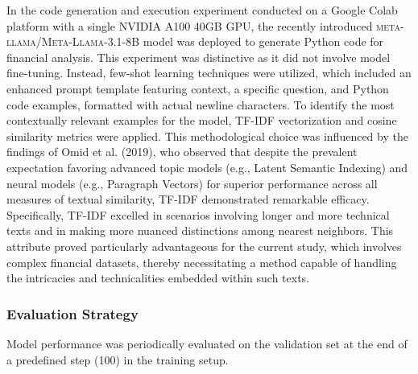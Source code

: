 \documentclass[logo,msc]{infthesis}           %
\begin{document}
In the code generation and execution experiment conducted on a Google Colab platform with a single NVIDIA A100 40GB GPU, the recently introduced \textsc{meta-llama/Meta-Llama-3.1-8B} model was deployed to generate Python code for financial analysis. This experiment was distinctive as it did not involve model fine-tuning. Instead, few-shot learning techniques were utilized, which included an enhanced prompt template featuring context, a specific question, and Python code examples, formatted with actual newline characters. To identify the most contextually relevant examples for the model, TF-IDF vectorization \cite{8999168} and cosine similarity metrics were applied. This methodological choice was influenced by the findings of Omid et al. (2019), who observed that despite the prevalent expectation favoring advanced topic models (e.g., Latent Semantic Indexing) and neural models (e.g., Paragraph Vectors) for superior performance across all measures of textual similarity, TF-IDF demonstrated remarkable efficacy. Specifically, TF-IDF excelled in scenarios involving longer and more technical texts and in making more nuanced distinctions among nearest neighbors. This attribute proved particularly advantageous for the current study, which involves complex financial datasets, thereby necessitating a method capable of handling the intricacies and technicalities embedded within such texts.


\subsubsection*{Evaluation Strategy}
Model performance was periodically evaluated on the validation set at the end of a predefined step (100) in the training setup.

\end{document}

